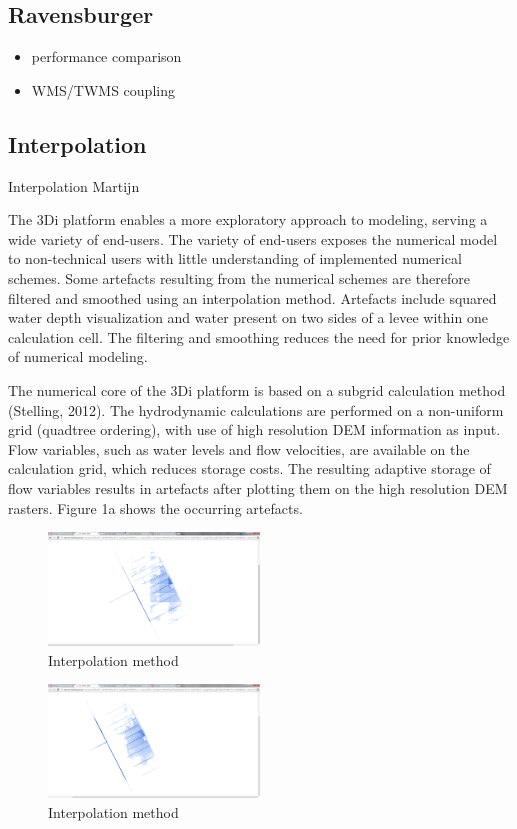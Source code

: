 \documentclass[a4paper]{article}
\begin{document}
\subsection{Ravensburger }
\begin{itemize}
  \item performance comparison
  \item WMS/TWMS coupling
\end{itemize}
\subsection{Interpolation}
Interpolation Martijn

The 3Di platform enables a more exploratory approach to modeling, serving a wide variety of end-users. The variety of end-users exposes the numerical model to non-technical users with little understanding of implemented numerical schemes. Some artefacts resulting from the numerical schemes are therefore filtered and smoothed using an interpolation method. Artefacts include squared water depth visualization and water present on two sides of a levee within one calculation cell. The filtering and smoothing reduces the need for prior knowledge of numerical modeling.

The numerical core of the 3Di platform is based on a subgrid calculation method (Stelling, 2012). The hydrodynamic calculations are performed on a non-uniform grid (quadtree ordering), with use of high resolution \ac{DEM} information as input. Flow variables, such as water levels and flow velocities, are available on the calculation grid, which reduces storage costs. The resulting adaptive storage of flow variables results in artefacts after plotting them on the high resolution \ac{DEM} rasters. Figure 1a shows the occurring artefacts.


\begin{figure}[h]
  \centering
  \includegraphics[width=0.5\textwidth]{artifacts_a}
  \caption{Interpolation method}
  \label{fig:artifacts_a}
\end{figure}

\begin{figure}[h]
  \centering
  \includegraphics[width=0.5\textwidth]{artifacts_b}
  \caption{Interpolation method}
  \label{fig:artifacts_b}
\end{figure}
\end{document}
